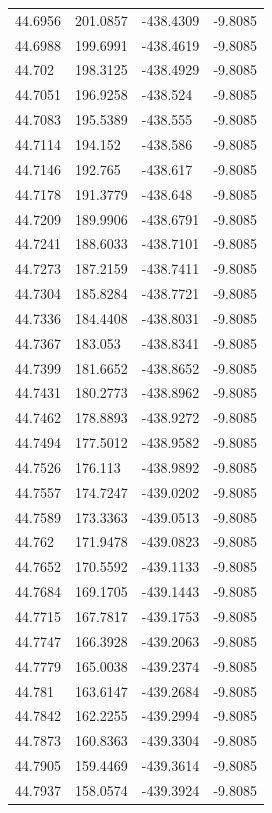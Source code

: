 \begin{table}[H]
\begin{tabular}{llll}
44.6956 & 201.0857 & -438.4309 & -9.8085 \\
44.6988 & 199.6991 & -438.4619 & -9.8085 \\
44.702 & 198.3125 & -438.4929 & -9.8085 \\
44.7051 & 196.9258 & -438.524 & -9.8085 \\
44.7083 & 195.5389 & -438.555 & -9.8085 \\
44.7114 & 194.152 & -438.586 & -9.8085 \\
44.7146 & 192.765 & -438.617 & -9.8085 \\
44.7178 & 191.3779 & -438.648 & -9.8085 \\
44.7209 & 189.9906 & -438.6791 & -9.8085 \\
44.7241 & 188.6033 & -438.7101 & -9.8085 \\
44.7273 & 187.2159 & -438.7411 & -9.8085 \\
44.7304 & 185.8284 & -438.7721 & -9.8085 \\
44.7336 & 184.4408 & -438.8031 & -9.8085 \\
44.7367 & 183.053 & -438.8341 & -9.8085 \\
44.7399 & 181.6652 & -438.8652 & -9.8085 \\
44.7431 & 180.2773 & -438.8962 & -9.8085 \\
44.7462 & 178.8893 & -438.9272 & -9.8085 \\
44.7494 & 177.5012 & -438.9582 & -9.8085 \\
44.7526 & 176.113 & -438.9892 & -9.8085 \\
44.7557 & 174.7247 & -439.0202 & -9.8085 \\
44.7589 & 173.3363 & -439.0513 & -9.8085 \\
44.762 & 171.9478 & -439.0823 & -9.8085 \\
44.7652 & 170.5592 & -439.1133 & -9.8085 \\
44.7684 & 169.1705 & -439.1443 & -9.8085 \\
44.7715 & 167.7817 & -439.1753 & -9.8085 \\
44.7747 & 166.3928 & -439.2063 & -9.8085 \\
44.7779 & 165.0038 & -439.2374 & -9.8085 \\
44.781 & 163.6147 & -439.2684 & -9.8085 \\
44.7842 & 162.2255 & -439.2994 & -9.8085 \\
44.7873 & 160.8363 & -439.3304 & -9.8085 \\
44.7905 & 159.4469 & -439.3614 & -9.8085 \\
44.7937 & 158.0574 & -439.3924 & -9.8085 \\

\end{tabular}
\end{table}

